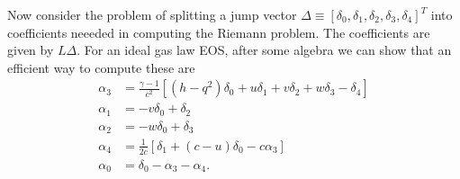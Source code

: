 \documentclass[11pt, reqno]{amsart}
\theoremstyle{definition}
\begin{document}
Now consider the problem of splitting a jump vector $\Delta \equiv
[\delta_0,\delta_1,\delta_2,\delta_3,\delta_4]^T$ into coefficients
neeeded in computing the Riemann problem. The coefficients are given
by $L\Delta$. For an ideal gas law EOS, after some algebra we can show
that an efficient way to compute these are
\begin{align}
  \alpha_3 &= \frac{\gamma-1}{c^2}
  \left[
    (h-q^2)\delta_0 + u\delta_1 + v\delta_2 + w\delta_3 -\delta_4
  \right] \\
  \alpha_1 &= -v\delta_0 + \delta_2 \\
  \alpha_2 &= -w\delta_0 + \delta_3 \\
  \alpha_4 &= \frac{1}{2c}
  \left[
    \delta_1 + (c-u)\delta_0 - c\alpha_3
  \right] \\
  \alpha_0 &= \delta_0 - \alpha_3 - \alpha_4.
\end{align}



\end{document}
